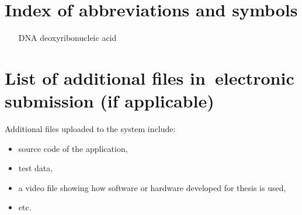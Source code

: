 \documentclass[a4paper,twoside,12pt]{book}
\newcounter{PagesWithoutNumbers}
\begin{document}
\backmatter
{}
\setcounter{page}{\value{PagesWithoutNumbers}}

\pagestyle{onlyPageNumbers}

\printbibliography           %


\begin{appendices} 


 

\chapter*{Index of abbreviations and symbols}

\begin{itemize}
\item[DNA] deoxyribonucleic acid
\end{itemize}




\chapter*{List of additional files in~electronic submission (if applicable)}

Additional files uploaded to the system include:
\begin{itemize}
\item source code of the application,
\item test data,
\item a video file showing how software or hardware developed for thesis is used,
\item etc.
\end{itemize}
 
\listoffigures
{}
\listoftables
{}

\end{appendices}
\end{document}
